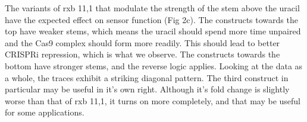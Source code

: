 \documentclass{article}
\newcommand{\rxb}[1]{rxb 11,1}
\begin{document}
The variants of \rxb{} that modulate the strength of the stem above the 
uracil have the expected effect on sensor function (Fig 2c).  The constructs 
towards the top have weaker stems, which means the uracil should spend more 
time unpaired and the Cas9 complex should form more readily.  This should lead 
to better CRISPRi repression, which is what we observe.  The constructs towards 
the bottom have stronger stems, and the reverse logic applies.  Looking at the 
data as a whole, the traces exhibit a striking diagonal pattern.  The third 
construct in particular may be useful in it's own right.  Although it's fold 
change is slightly worse than that of \rxb{}, it turns on more completely, and 
that may be useful for some applications.
\end{document}
